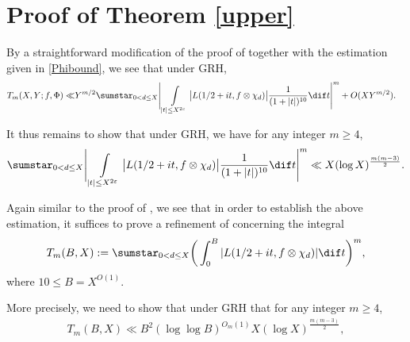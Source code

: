 \documentclass[twoside,leqno,10pt, A4]{amsart}
\begin{document}
\section{Proof of Theorem \ref{upper}}



   By a straightforward modification of the proof of \cite[Theorem 1.5]{G&Zhao24-12} together with the estimation given in \eqref{Phibound}, we see that under GRH,
\begin{align*}
 T_m (X,Y;f,\Phi) \ll &
   Y^{m/2}\sumstar_{0<d\leq X}\Bigg| \int\limits_{ |t|\leq X^{2\varepsilon}}\big|L( 1/2+it, f \otimes\chi_d)\big|\frac{1}{(1+|t|)^{10}} \dif t\Bigg|^{m}+O(XY^{m/2}).
\end{align*} 	

   It thus remains to show that under GRH, we have for any integer $m \geq 4$,
\begin{equation*}
 \sumstar_{0<d \leq X }
   \Bigg| \int\limits_{ |t|\leq X^{2\varepsilon}}\big|L( 1/2+it, f \otimes\chi_d)\big|\frac{1}{(1+|t|)^{10}} \dif t\Bigg|^{m} \ll X(\log X)^{\frac{m(m-3)}{2}}.
\end{equation*}

   Again similar to the proof of \cite[Lemma 5.1]{G&Zhao24-12}, we see that in order to establish the above estimation, it suffices to prove a refinement of  \cite[Proposition 5.4]{G&Zhao24-12} concerning the integral
\begin{equation*}
    T_m(B,X):=\sumstar_{0<d \leq X }\bigg( \int_{0}^{B} |L(1/2+it,f\otimes\chi_d) | \dif t \bigg)^{m},
\end{equation*}
where $10 \leq B=X^{O(1)}$.

   More precisely, we need to show that under GRH that for any integer $m \geq 4$,
\begin{align}
\label{Tbound}
    T_m(B,X) \ll B^2(\log \log B)^{O_m(1)}X(\log X)^{\frac{m(m-3)}{2}},
\end{align}
\end{document}
